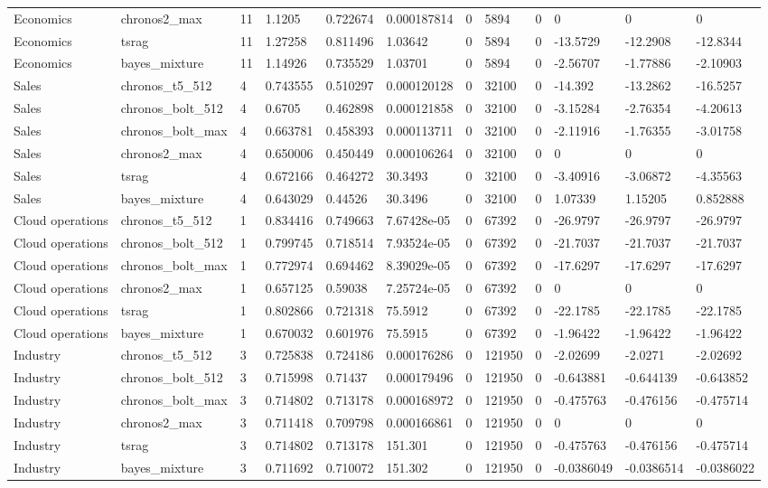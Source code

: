 \begin{tabular}{llllllllllll}
Economics & chronos2\_max & 11 & 1.1205 & 0.722674 & 0.000187814 & 0 & 5894 & 0 & 0 & 0 & 0 \\
Economics & tsrag & 11 & 1.27258 & 0.811496 & 1.03642 & 0 & 5894 & 0 & -13.5729 & -12.2908 & -12.8344 \\
Economics & bayes\_mixture & 11 & 1.14926 & 0.735529 & 1.03701 & 0 & 5894 & 0 & -2.56707 & -1.77886 & -2.10903 \\
Sales & chronos\_t5\_512 & 4 & 0.743555 & 0.510297 & 0.000120128 & 0 & 32100 & 0 & -14.392 & -13.2862 & -16.5257 \\
Sales & chronos\_bolt\_512 & 4 & 0.6705 & 0.462898 & 0.000121858 & 0 & 32100 & 0 & -3.15284 & -2.76354 & -4.20613 \\
Sales & chronos\_bolt\_max & 4 & 0.663781 & 0.458393 & 0.000113711 & 0 & 32100 & 0 & -2.11916 & -1.76355 & -3.01758 \\
Sales & chronos2\_max & 4 & 0.650006 & 0.450449 & 0.000106264 & 0 & 32100 & 0 & 0 & 0 & 0 \\
Sales & tsrag & 4 & 0.672166 & 0.464272 & 30.3493 & 0 & 32100 & 0 & -3.40916 & -3.06872 & -4.35563 \\
Sales & bayes\_mixture & 4 & 0.643029 & 0.44526 & 30.3496 & 0 & 32100 & 0 & 1.07339 & 1.15205 & 0.852888 \\
Cloud operations & chronos\_t5\_512 & 1 & 0.834416 & 0.749663 & 7.67428e-05 & 0 & 67392 & 0 & -26.9797 & -26.9797 & -26.9797 \\
Cloud operations & chronos\_bolt\_512 & 1 & 0.799745 & 0.718514 & 7.93524e-05 & 0 & 67392 & 0 & -21.7037 & -21.7037 & -21.7037 \\
Cloud operations & chronos\_bolt\_max & 1 & 0.772974 & 0.694462 & 8.39029e-05 & 0 & 67392 & 0 & -17.6297 & -17.6297 & -17.6297 \\
Cloud operations & chronos2\_max & 1 & 0.657125 & 0.59038 & 7.25724e-05 & 0 & 67392 & 0 & 0 & 0 & 0 \\
Cloud operations & tsrag & 1 & 0.802866 & 0.721318 & 75.5912 & 0 & 67392 & 0 & -22.1785 & -22.1785 & -22.1785 \\
Cloud operations & bayes\_mixture & 1 & 0.670032 & 0.601976 & 75.5915 & 0 & 67392 & 0 & -1.96422 & -1.96422 & -1.96422 \\
Industry & chronos\_t5\_512 & 3 & 0.725838 & 0.724186 & 0.000176286 & 0 & 121950 & 0 & -2.02699 & -2.0271 & -2.02692 \\
Industry & chronos\_bolt\_512 & 3 & 0.715998 & 0.71437 & 0.000179496 & 0 & 121950 & 0 & -0.643881 & -0.644139 & -0.643852 \\
Industry & chronos\_bolt\_max & 3 & 0.714802 & 0.713178 & 0.000168972 & 0 & 121950 & 0 & -0.475763 & -0.476156 & -0.475714 \\
Industry & chronos2\_max & 3 & 0.711418 & 0.709798 & 0.000166861 & 0 & 121950 & 0 & 0 & 0 & 0 \\
Industry & tsrag & 3 & 0.714802 & 0.713178 & 151.301 & 0 & 121950 & 0 & -0.475763 & -0.476156 & -0.475714 \\
Industry & bayes\_mixture & 3 & 0.711692 & 0.710072 & 151.302 & 0 & 121950 & 0 & -0.0386049 & -0.0386514 & -0.0386022 \\
\bottomrule
\end{tabular}
